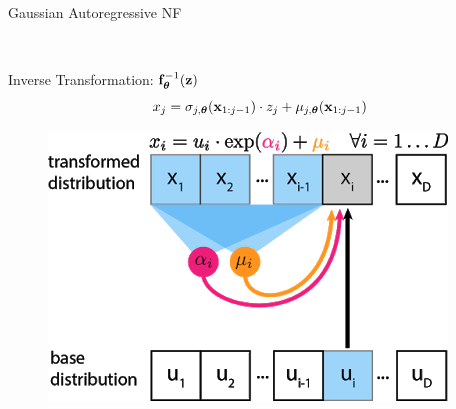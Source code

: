 \documentclass{beamer}
\begin{document}
\begin{frame}{Gaussian Autoregressive NF}
\begin{minipage}[t]{0.35\columnwidth}
\begin{figure}[h]
		\end{figure}
	\end{minipage} \\
	\eqpause
	\begin{minipage}[t]{0.65\columnwidth}
		\begin{block}{Inverse Transformation: $\mathbf{f}^{-1}_{\boldsymbol{\theta}}(\mathbf{z})$}
			\vspace{-0.5cm}
			\[
				x_j = \sigma_{j, \boldsymbol{\theta}} (\mathbf{x}_{1:j-1}) \cdot z_j + \mu_{j, \boldsymbol{\theta}}(\mathbf{x}_{1:j-1})
			\]
		\end{block}
	\end{minipage}%
	\begin{minipage}[t]{0.35\columnwidth}
		\begin{figure}[h]
			\centering
			\includegraphics[width=.9\linewidth]{figs/af_iaf_explained_1.png}
		\end{figure}
	\end{minipage}
\end{frame}
\end{document}
